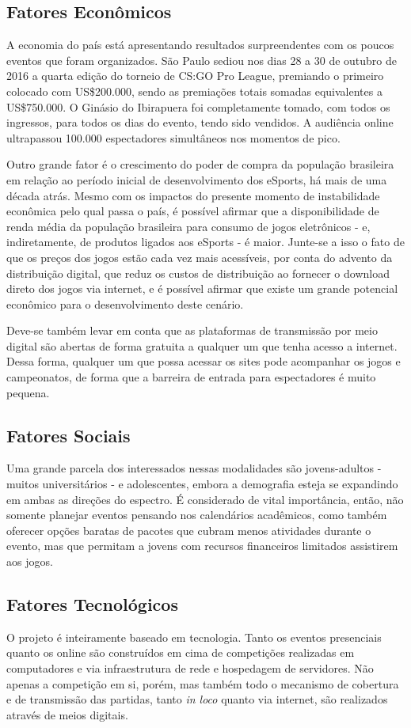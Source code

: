 \documentclass[a4paper, 12pt]{paper}
\begin{document}
\subsection{Fatores Econômicos}
A economia do país está apresentando resultados surpreendentes com os poucos eventos que foram organizados. São Paulo sediou nos dias 28 a 30 de outubro de 2016 a quarta edição do torneio de CS:GO Pro League, premiando o primeiro colocado com US\$200.000, sendo as premiações totais somadas equivalentes a US\$750.000. O Ginásio do Ibirapuera foi completamente  tomado, com todos os ingressos, para todos os dias do evento, tendo sido vendidos. A audiência online ultrapassou 100.000 espectadores simultâneos nos momentos de pico.

Outro grande fator é o crescimento do poder de compra da população brasileira em relação ao período inicial de desenvolvimento dos eSports, há mais de uma década atrás. Mesmo com os impactos do presente momento de instabilidade econômica pelo qual passa o país, é possível afirmar que a disponibilidade de renda média da população brasileira para consumo de jogos eletrônicos - e, indiretamente, de produtos ligados aos eSports - é maior. Junte-se a isso o fato de que os preços dos jogos estão cada vez mais acessíveis, por conta do advento da distribuição digital, que reduz os custos de distribuição ao fornecer o download direto dos jogos via internet, e é possível afirmar que existe um grande potencial econômico para o desenvolvimento deste cenário.

Deve-se também levar em conta que as plataformas de transmissão por meio digital são abertas de forma gratuita a qualquer um que tenha acesso a internet. Dessa forma, qualquer um que possa acessar os sites pode acompanhar os jogos e campeonatos, de forma que a barreira de entrada para espectadores é muito pequena.
\subsection{Fatores Sociais}
Uma grande parcela dos interessados nessas modalidades são jovens-adultos - muitos universitários - e adolescentes, embora a demografia esteja se expandindo em ambas as direções do espectro. É considerado de vital importância, então,  não somente planejar eventos pensando nos calendários acadêmicos, como também oferecer opções baratas de pacotes que cubram menos atividades durante o evento, mas que permitam a jovens com recursos financeiros limitados assistirem aos jogos.
\subsection{Fatores Tecnológicos}
O projeto é inteiramente baseado em tecnologia. Tanto os eventos presenciais quanto os online são construídos em cima de competições realizadas em computadores e via infraestrutura de rede e hospedagem de servidores. Não apenas a competição em si, porém, mas também todo o mecanismo de cobertura e de transmissão das partidas, tanto \textit{in loco} quanto via internet, são realizados através de meios digitais.
\end{document}
